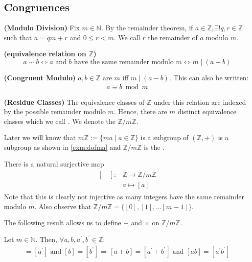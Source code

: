 \documentclass{article}
\newcommand{\bfs}[1]{\textbf{({#1}) }}
\begin{document}
\subsection{Congruences}
\begin{defa}{\bfs{Modulo Division}}
Fix $m \in \mathbb{N}$. By the remainder theorem, if $a \in \mathbb{Z}, \exists ! q, r \in \mathbb{Z}$ such that $a=q m+r$ and $0 \leq r<m$. We call $r$ the remainder of $a$ modulo $m$.
\end{defa}
\begin{rema}{\bfs{equivalence relation on $\mathbb{Z}$}}
$$a \sim b \Longleftrightarrow a \text{ and } b\text{ have the same remainder modulo } m \Longleftrightarrow m \mid(a-b)$$
\end{rema}
\begin{defa}{\bfs{Congruent Modulo}}
$a, b \in \mathbb{Z}$ are  $m$ iff $m \mid(a-b) .$ This can also be written:
\begin{align*}
a \equiv b \bmod m
\end{align*}
\end{defa} 
\begin{defa}{\bfs{Residue Classes}}\label{eq:dfatdc}
The equivalence classes of $\mathbb{Z}$ under this relation are indexed by the possible remainder modulo $m .$ Hence, there are $m$ distinct equivalence classes which we call . We denote the  $\mathbb{Z} / m\mathbb{Z}$. 
\end{defa}
\begin{rema}
Later we will know that $m \mathbb{Z}:=\{m a \mid a \in \mathbb{Z}\}$ is a subgroup of $(\mathbb{Z},+)$ is a subgroup as shown in \cref{exm:dofma} and $\mathbb{Z} / m\mathbb{Z}$ is the .
\end{rema}

     There is a natural surjective map
\begin{align*}
\begin{aligned}
[\quad]: & \mathbb{Z} \rightarrow \mathbb{Z} / m \mathbb{Z} \\
& a \mapsto[a]
\end{aligned}
\end{align*}
Note that this is clearly not injective as many integers have the same remainder modulo
$m .$ Also observe that $\mathbb{Z} / m \mathbb{Z}=\{[0],[1], \ldots[m-1]\} .$


The following result allows us to define $+$ and $\times$ on $\mathbb{Z} / m \mathbb{Z}$.
\begin{lema}
Let $m \in \mathbb{N}$. Then, $\forall a, b, a^{\prime}, b^{\prime} \in \mathbb{Z}:$
\begin{align*}
[a]=\left[a^{\prime}\right] \text { and }[b]=\left[b^{\prime}\right] \Rightarrow[a+b]=\left[a^{\prime}+b^{\prime}\right] \text { and }[a b]=\left[a^{\prime} b^{\prime}\right]
\end{align*}
\end{lema} 
\end{document}
